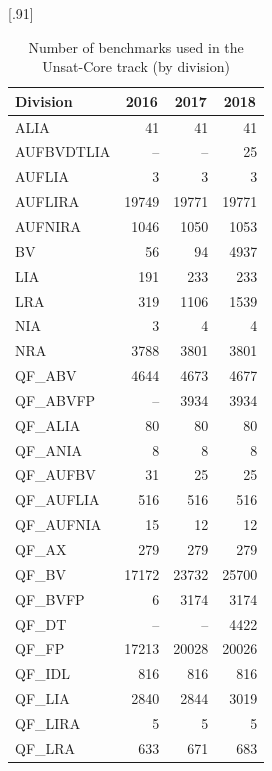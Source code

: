 \documentclass[dvipsnames,table,twoside,11pt]{article}
\begin{document}
\begin{table}
  \caption{Number of benchmarks used in the Unsat-Core track (by
    division)}
  \label{table:benchmarks-unsat-core-track}
  \centering
  \scalebox{1}[.91]{\begin{tabular}{lrrr}
    \toprule
    Division & \multicolumn{1}{c}{2016} & \multicolumn{1}{c}{2017} & \multicolumn{1}{c}{2018} \\
    \midrule
    ALIA       &     41 &     41 &     41 \\
    AUFBVDTLIA &     -- &     -- &     25 \\
    AUFLIA     &      3 &      3 &      3 \\
    AUFLIRA    &  19749 &  19771 &  19771 \\
    AUFNIRA    &   1046 &   1050 &   1053 \\
    BV         &     56 &     94 &   4937 \\
    LIA        &    191 &    233 &    233 \\
    LRA        &    319 &   1106 &   1539 \\
    NIA        &      3 &      4 &      4 \\
    NRA        &   3788 &   3801 &   3801 \\
    QF\_ABV    &   4644 &   4673 &   4677 \\
    QF\_ABVFP  &     -- &   3934 &   3934 \\
    QF\_ALIA   &     80 &     80 &     80 \\
    QF\_ANIA   &      8 &      8 &      8 \\
    QF\_AUFBV  &     31 &     25 &     25 \\
    QF\_AUFLIA &    516 &    516 &    516 \\
    QF\_AUFNIA &     15 &     12 &     12 \\
    QF\_AX     &    279 &    279 &    279 \\
    QF\_BV     &  17172 &  23732 &  25700 \\
    QF\_BVFP   &      6 &   3174 &   3174 \\
    QF\_DT     &     -- &     -- &   4422 \\
    QF\_FP     &  17213 &  20028 &  20026 \\
    QF\_IDL    &    816 &    816 &    816 \\
    QF\_LIA    &   2840 &   2844 &   3019 \\
    QF\_LIRA   &      5 &      5 &      5 \\
    QF\_LRA    &    633 &    671 &    683 \\

\end{tabular}}
\end{table}
\end{document}
